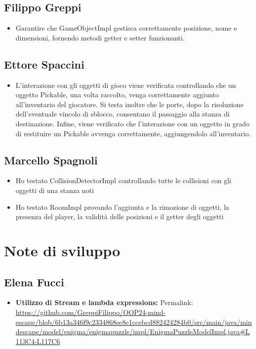 \documentclass[a4paper,12pt]{report}
\begin{document}
\subsection{Filippo Greppi}
\begin{itemize}
	\item Garantire che GameObjectImpl gestisca correttamente posizione, nome e dimensioni, fornendo metodi getter e setter funzionanti.
\end{itemize}

\subsection{Ettore Spaccini}
\begin{itemize}
	\item L'interazione con gli oggetti di gioco viene verificata controllando che un oggetto Pickable, una volta raccolto, venga correttamente aggiunto all’inventario del giocatore. Si testa inoltre che le porte, dopo la risoluzione dell’eventuale vincolo di sblocco, consentano il passaggio alla stanza di destinazione. Infine, viene verificato che l’interazione con un oggetto in grado di restituire un Pickable avvenga correttamente, aggiungendolo all’inventario.
\end{itemize}

\subsection{Marcello Spagnoli}
\begin{itemize}
	\item Ho testato CollisionDetectorImpl controllando tutte le collisioni con gli oggetti di una stanza noti
	\item Ho testato RoomImpl provando l'aggiunta e la rimozione di oggetti, la presenza del player, la validità delle posizioni e il getter degli oggetti
\end{itemize}

%
\section{Note di sviluppo}
%
\subsection{Elena Fucci}
%
\begin{itemize}
	\item \textbf{Utilizzo di Stream e lambda expressions:}
	Permalink: \url{https://github.com/GreppiFilippo/OOP24-mind-escape/blob/6b13a346f9c2334868ee8e1ccebcd882424284b0/src/main/java/mindescape/model/enigma/enigmapuzzle/impl/EnigmaPuzzleModelImpl.java#L113C4-L117C6}
\end{itemize}
%
\end{document}
